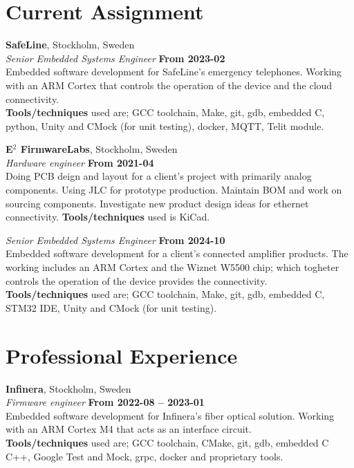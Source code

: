 \documentclass[a4paper,margin,line]{res} \usepackage{latexsym}
\begin{document}
\begin{resume}


\section{\sc Current Assignment}

{\bf SafeLine}, Stockholm, Sweden\\
{\em Senior Embedded Systems Engineer} \hfill {\bf From 2023-02}\\
Embedded software development for SafeLine's emergency telephones.
Working with an ARM Cortex that controls the operation of the device and the cloud connectivity.
\\ {\bf Tools/techniques} used are; GCC toolchain, Make, git, gdb, embedded C, python,
Unity and CMock (for unit testing), docker, MQTT, Telit module.

{\bf E$^2$ FirmwareLabs}, Stockholm, Sweden\\
{\em Hardware engineer} \hfill {\bf From 2021-04}\\
Doing PCB deign and layout for a client's project with primarily
analog components. Using JLC for prototype production. Maintain BOM
and work on sourcing components. Investigate new product design ideas
for ethernet connectivity.
{\bf Tools/techniques} used is KiCad.

{\em Senior Embedded Systems Engineer} \hfill {\bf From 2024-10}\\
Embedded software development for a client's connected amplifier products.
The working includes an ARM Cortex and the Wiznet W5500 chip; which togheter
controls the operation of the device provides the connectivity.
\\ {\bf Tools/techniques} used are; GCC toolchain, Make, git, gdb, embedded C, STM32 IDE,
Unity and CMock (for unit testing).

\vspace{3mm}

\section{\sc Professional Experience}

{\bf Infinera}, Stockholm, Sweden\\
{\em Firmware engineer} \hfill {\bf From 2022-08 -- 2023-01}\\
Embedded software development for Infinera's fiber optical solution.
Working with an ARM Cortex M4 that acts as an interface circuit.
\\ {\bf Tools/techniques} used are; GCC toolchain, CMake, git, gdb, embedded C C++,
Google Test and Mock, grpc, docker and proprietary tools.


\end{resume}
\end{document}
